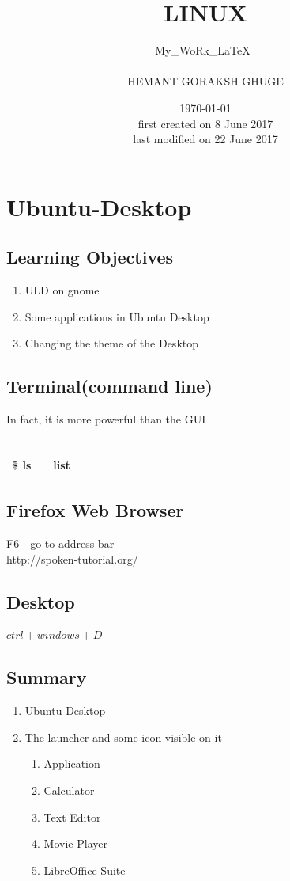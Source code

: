 \documentclass[12pt, a4paper]{report}
\author {My\_WoRk\_\LaTeX\ \\ \\ HEMANT GORAKSH GHUGE \\\byncsa}
\title {LINUX}
\date {\today  \\first created on 8 June 2017 \\ last modified on 22 June 2017}
\begin{document}
\maketitle
{}
\setcounter{page}{2}
\tableofcontents
%
\chapter{Ubuntu-Desktop}
\section{Learning Objectives}
\begin{enumerate}
\item ULD on gnome
\item Some applications in Ubuntu Desktop
\item Changing the theme of the Desktop
\end{enumerate}
\section{Terminal(command line)}
In fact, it is more powerful than the GUI\\
\\
\begin{tabular}{|lcr|}\hline
\$ ls && list \\ \hline
\end{tabular}
\section{Firefox Web Browser}
F6 - go to address bar\\
http://spoken-tutorial.org/
\section{Desktop}
$ctrl+windows+D$
\section{Summary}
\begin{enumerate}
\item Ubuntu Desktop
\item The launcher and some icon visible on it
\begin{enumerate}
\item Application
\item Calculator
\item Text Editor
\item Movie Player
\item LibreOffice Suite
\end{enumerate}
\end{enumerate}
%
\end{document}
